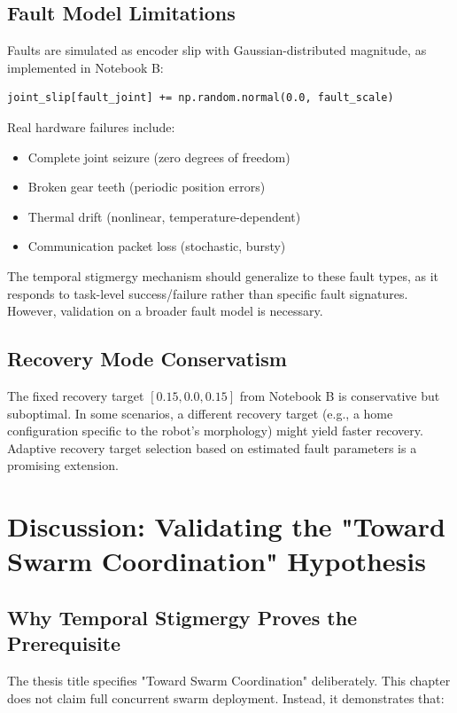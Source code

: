 ﻿\documentclass[12pt,a4paper,oneside]{report}
\begin{document}
\subsection{Fault Model Limitations}

Faults are simulated as encoder slip with Gaussian-distributed magnitude, as implemented in Notebook B:

\begin{verbatim}
joint_slip[fault_joint] += np.random.normal(0.0, fault_scale)
\end{verbatim}

Real hardware failures include:
\begin{itemize}
    \item Complete joint seizure (zero degrees of freedom)
    \item Broken gear teeth (periodic position errors)
    \item Thermal drift (nonlinear, temperature-dependent)
    \item Communication packet loss (stochastic, bursty)
\end{itemize}

The temporal stigmergy mechanism should generalize to these fault types, as it responds to task-level success/failure rather than specific fault signatures. However, validation on a broader fault model is necessary.

\subsection{Recovery Mode Conservatism}

The fixed recovery target $[0.15, 0.0, 0.15]$ from Notebook B is conservative but suboptimal. In some scenarios, a different recovery target (e.g., a home configuration specific to the robot's morphology) might yield faster recovery. Adaptive recovery target selection based on estimated fault parameters is a promising extension.

\section{Discussion: Validating the "Toward Swarm Coordination" Hypothesis}

\subsection{Why Temporal Stigmergy Proves the Prerequisite}

The thesis title specifies "Toward Swarm Coordination" deliberately. This chapter does not claim full concurrent swarm deployment. Instead, it demonstrates that:
\end{document}
